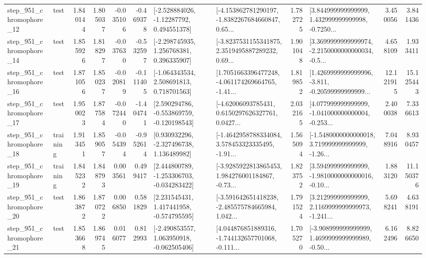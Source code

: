 \begin{tabular}{llrrrrllrlrr}
  step\_951\_chromophore\_12 &      test &      1.840144 &    1.805037 &     -0.035106 & -0.469378 &    [-2.528884026, -1.12287792, 0.494551378] &  [-4.153862781290197, -1.8382267684660847, 0.65... &       1.782725 &  [3.844999999999999, 1.432999999999998, -0.7250... &            3.450056 &          3.841436 \\
  step\_951\_chromophore\_14 &      test &      1.855926 &    1.818297 &     -0.037630 & -0.532597 &    [-2.298745935, 1.256768381, 0.396335907] &  [-3.8237531155341875, 2.3519495887289232, 0.69... &       1.901048 &  [3.3699999999999974, -2.2150000000000034, -0.5... &            4.658109 &          1.933411 \\
  step\_951\_chromophore\_16 &      test &      1.871056 &    1.850237 &     -0.020819 & -0.111405 &    [-1.064343534, 2.508691813, 0.718701563] &  [1.7051663396477248, -4.061174269664765, -1.41... &       1.819852 &  [1.4269999999999996, -3.811, -0.20599999999999... &           12.121915 &         15.125443 \\
  step\_951\_chromophore\_17 &      test &      1.950023 &    1.877584 &     -0.072440 & -1.404741 &   [2.590294786, -0.553869759, -0.120198543] &  [-4.62006093785431, 0.6150297626327761, 0.0427... &       2.032165 &  [4.077999999999999, -1.041000000000004, -0.253... &            2.400038 &          7.336613 \\
  step\_951\_chromophore\_18 &  training &      1.913451 &    1.859057 &     -0.054394 & -0.952614 &    [0.930932296, -2.327496738, 1.136489982] &  [-1.4642958788334084, 3.578453323335495, -1.91... &       1.565094 &  [-1.5480000000000018, 3.719999999999999, -1.26... &            7.048916 &          8.930457 \\
  step\_951\_chromophore\_19 &  training &      1.845232 &    1.848793 &      0.003561 &  0.499417 &   [2.444800789, -1.253306703, -0.034283422] &  [-3.9285922813865453, 1.984276001184867, -0.73... &       1.823752 &  [3.594999999999999, -1.9810000000000016, -0.10... &            1.883120 &         11.150376 \\
  step\_951\_chromophore\_20 &      test &      1.863872 &    1.870722 &      0.006850 &  0.581829 &    [2.231545431, 1.417441958, -0.574795595] &  [-3.591642651418238, -2.485575784665984, 1.042... &       1.791524 &  [3.212999999999999, 2.1169999999999973, -1.241... &            5.698241 &          4.638191 \\
  step\_951\_chromophore\_21 &      test &      1.853668 &    1.869745 &      0.016077 &  0.812993 &   [-2.490853557, 1.063950918, -0.062505406] &  [4.044876851889316, -1.744132657701068, -0.111... &       1.705270 &  [-3.908999999999999, 1.4699999999999989, -0.50... &            6.162496 &          8.826650 \\

\end{tabular}

